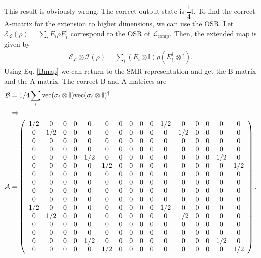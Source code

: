\documentclass[12pt]{iopart}
\begin{document}
This result is obviously wrong. The correct output state is $\dfrac{1}{4}\mathbb{I}$. To find the correct A-matrix for the extension to higher dimensions, we can use the OSR. Let $\mathcal{E}_\mathcal{L}(\rho)=\sum_iE_i\rho E_i^\dagger$ correspond to the OSR of $\mathcal{L}_{\text{comp}}$. Then, the extended map is given by
\begin{align}
    \mathcal{E}_\mathcal{L}\otimes\mathcal{I}(\rho)=\sum_i(E_i\otimes \mathbb{I})\rho(E_i^\dagger\otimes \mathbb{I}).
\end{align}
Using Eq. \eqref{Bmap} we can return to the SMR representation and get the B-matrix and the A-matrix. 
The correct B and A-matrices are
\begin{align}
    \notag\mathcal{B}&=1/4\sum_i{\text{vec}(\sigma_i\otimes\mathbb{I})\text{vec}(\sigma_i\otimes\mathbb{I})^\dagger}\\
    \notag&\Rightarrow\\
    \mathcal{A}&=\left(\begin{array}{cccccccccccccccc}
         1/2 & 0 & 0 & 0 & 0 & 0 & 0 & 0 & 0 & 0 & 1/2 & 0 & 0 & 0 & 0 & 0\\
         0 & 1/2 & 0 & 0 & 0 & 0 & 0 & 0 & 0 & 0 & 0 & 1/2 & 0 & 0 & 0 & 0\\
         0 & 0 & 0 & 0 & 0 & 0 & 0 & 0 & 0 & 0 & 0 & 0 & 0 & 0 & 0 & 0\\
         0 & 0 & 0 & 0 & 0 & 0 & 0 & 0 & 0 & 0 & 0 & 0 & 0 & 0 & 0 & 0\\
         0 & 0 & 0 & 0 & 1/2 & 0 & 0 & 0 & 0 & 0 & 0 & 0 & 0 & 0 & 1/2 & 0\\
         0 & 0 & 0 & 0 & 0 & 1/2 & 0 & 0 & 0 & 0 & 0 & 0 & 0 & 0 & 0 & 1/2\\
         0 & 0 & 0 & 0 & 0 & 0 & 0 & 0 & 0 & 0 & 0 & 0 & 0 & 0 & 0 & 0\\
         0 & 0 & 0 & 0 & 0 & 0 & 0 & 0 & 0 & 0 & 0 & 0 & 0 & 0 & 0 & 0\\
         0 & 0 & 0 & 0 & 0 & 0 & 0 & 0 & 0 & 0 & 0 & 0 & 0 & 0 & 0 & 0\\
         0 & 0 & 0 & 0 & 0 & 0 & 0 & 0 & 0 & 0 & 0 & 0 & 0 & 0 & 0 & 0\\
         1/2 & 0 & 0 & 0 & 0 & 0 & 0 & 0 & 0 & 0 & 1/2 & 0 & 0 & 0 & 0 & 0\\
         0 & 1/2 & 0 & 0 & 0 & 0 & 0 & 0 & 0 & 0 & 0 & 1/2 & 0 & 0 & 0 & 0\\
         0 & 0 & 0 & 0 & 0 & 0 & 0 & 0 & 0 & 0 & 0 & 0 & 0 & 0 & 0 & 0\\
         0 & 0 & 0 & 0 & 0 & 0 & 0 & 0 & 0 & 0 & 0 & 0 & 0 & 0 & 0 & 0\\
         0 & 0 & 0 & 0 & 1/2 & 0 & 0 & 0 & 0 & 0 & 0 & 0 & 0 & 0 & 1/2 & 0\\
         0 & 0 & 0 & 0 & 0 & 1/2 & 0 & 0 & 0 & 0 & 0 & 0 & 0 & 0 & 0 & 1/2
    \end{array}\right).
\end{align}
\end{document}
